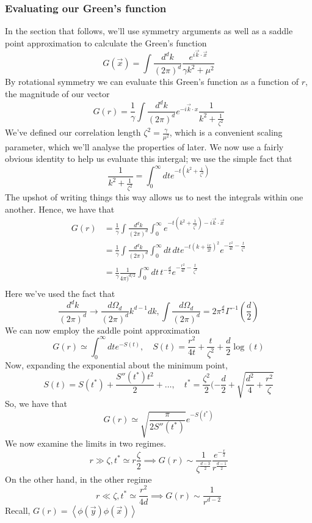 \documentclass[11pt, oneside]{article}   	%
\begin{document}
\subsubsection{Evaluating our Green's function} 
In the section that follows, we'll use symmetry arguments 
as well as a saddle point approximation to calculate the Green's function 
\[
	G ( \vec{x} ) = \int \frac{ d^ d k }{ ( 2 \pi ) ^ d } \frac{ e^{ i \vec{k} \cdot  \vec{x}  }}{ \gamma k^2 + \mu ^ 2 }
\] By rotational symmetry we can evaluate this Green's function as 
a function of $ r $, the magnitude of our vector 
\[
	G ( r)  =\frac{1}{\gamma } \int \frac{ d^ d k }{ ( 2 \pi ) ^ d } e^{  - i \vec{k} \cdot  x } \frac{1}{ k^ 2 + \frac{1}{ \zeta ^ 2 }}
\] We've defined our correlation length $ \zeta^ 2 = \frac{ \gamma }{ \mu^ 2 }$, which 
is a convenient scaling parameter, which we'll analyse the properties of later.  
We now use a fairly obvious identity to help us evaluate this intergal; we use 
the simple fact that 
\[
	\frac{1}{ k ^ 2 + \frac{1}{ \zeta ^ 2} } = \int_0^\infty dt e^{  - t ( k^ 2 + \frac{1}{\zeta ^ 2} ) }
\] The upshot of writing things this way allows us 
to nest the integrals within one another. Hence, we have that  
\begin{align*}
	G ( r) &=  \frac{1}{\gamma} \int \frac{d^ d k }{ ( 2 \pi ) ^ d } \int_0^\infty e^{  - t ( k^ 2 + \frac{1}{\zeta ^ 2 }) - i \vec{k} \cdot  \vec{x} } \\
	       &=  \frac{1}{\gamma } \int \frac{d^ d k }{ ( 2 \pi ) ^ d } \int_0^\infty dt \, dt e^{  - t ( k + \frac{ i x }{2t  })^ 2 }e^{  - \frac{r^ 2 }{ 4t }  - \frac{t}{\zeta^ 2 }} \\
	       &=  \frac{1}{\gamma } \frac{1}{4 \pi )^{ d / 2}} \int_0^\infty dt \, t ^{  - \frac{d}{2 } } e^{  - \frac{r^ 2 }{ 4t }  - \frac{t}{\zeta^ 2 }} \\
\end{align*}
Here we've used the fact that 
\[
	\frac{ d^ d k }{ ( 2\pi ) ^ d } \to \frac{ d \Omega_d }{ ( 2 \pi ) ^ d} k^{ d - 1 } dk, \int \frac{ d \Omega_d }{ ( 2 \pi ) ^ d }  = 2 \pi^{ \frac{d}{ 2}} \Gamma^{ -1} ( \frac{d}{2 } ) 
\] We can now employ the saddle point approximation 
\[
	G ( r) \simeq \int_0^\infty dt e^{ - S( t ) }, \quad S( t ) = \frac{r^ 2 }{ 4t } + \frac{t}{\zeta^ 2 }+ \frac{d}{ 2 }\log ( t) 
\]  Now, expanding the exponential about the minimum point, 
\[
	S( t) = S( t^* ) + \frac{ S'' ( t^ * ) t^ 2 }{ 2 } + \dots, \quad t^ * = \frac{\zeta^ 2 }{2 } ( - \frac{d}{2 } + \sqrt{ \frac{d^2}{4 } + \frac{r^2}{\zeta}} 
\] So, we have that 
\[
	G ( r) \simeq \sqrt{ \frac{ \pi }{ 2 S'' ( t^ * ) }}e^{  - S( t^ * ) } 
\] We now examine the limits in two regimes. 
\[
	r \gg \zeta, t^ * \simeq r \frac{\zeta}{2 } \implies G ( r) \sim \frac{1}{\zeta^{ \frac{d - 3 }{2 }}} \frac{ e^{  -\frac{r}{2 }}}{r^{ \frac{d - 1 }{ 2}}}
\] On the other hand, in the other regime 
\[
	r \ll \zeta, t^ * \simeq \frac{r^ 2 }{ 4 d } \implies G ( r) \sim \frac{1}{r^{ d - 2 }}
\] Recall, $ G( r) = \left< \phi( \vec{y} ) \phi ( \vec{x} )  \right> $
\pagebreak 
\end{document}
